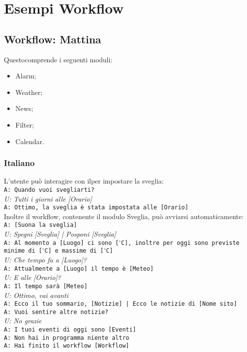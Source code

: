\section{Esempi Workflow}
\subsection{Workflow: Mattina}
Questocomprende i seguenti moduli:
\begin{itemize}
	\item Alarm;
	\item Weather;
	\item News;
	\item Filter;
	\item Calendar.
\end{itemize}

\subsubsection{Italiano}
L'utente può interagire con ilper impostare la sveglia:\\
\newline
\texttt{A: Quando vuoi svegliarti?}\\
\textit{U: Tutti i giorni alle [Orario]}\\
\texttt{A: Ottimo, la sveglia è stata impostata alle [Orario]} \\

Inoltre il workflow, contenente il modulo Sveglia, può avviarsi automaticamente:\\
\newline
\texttt{A: [Suona la sveglia]}\\
\textit{U: Spegni [Sveglia] | Posponi [Sveglia]}\\
\texttt{A: Al momento a [Luogo] ci sono [$^\circ$C], inoltre per oggi sono previste minime di [$^\circ$C] e massime di [$^\circ$C]}\\
\textit{U: Che tempo fa a [Luogo]?}\\
\texttt{A: Attualmente a [Luogo] il tempo è [Meteo]}\\
\textit{U: E alle [Orario]?}\\
\texttt{A: Il tempo sarà [Meteo]}\\
\textit{U: Ottimo, vai avanti}\\
\texttt{A: Ecco il tuo sommario, [Notizie] | Ecco le notizie di [Nome sito]}\\
\texttt{A: Vuoi sentire altre notizie?}\\ 
\textit{U: No grazie}\\
\texttt{A: I tuoi eventi di oggi sono [Eventi]}\\
\texttt{A: Non hai in programma niente altro}\\
\texttt{A: Hai finito il workflow [Workflow]}

